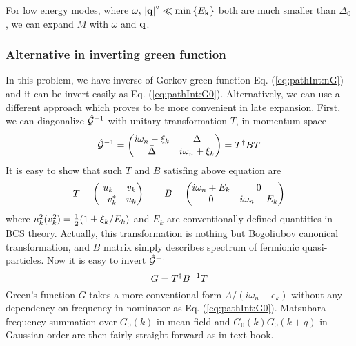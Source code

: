 For low energy modes, where $\omega,\,\lvert{\ensuremath{\mathbf{q}}}\rvert^{2}\ll\min\left\{E_{\mathbf{k}}\right\}$ both are much smaller than $\Delta_{0}$, we can expand $M$ with $\omega$ and $\mathbf{q}$.  


\subsubsection{Alternative in inverting green function\label{sec:diagonalizeGreen1}}
In this problem, we have inverse of Gorkov green function Eq. (\ref{eq:pathInt:nG}) and it can be invert easily as Eq. (\ref{eq:pathInt:G0}).   Alternatively, we can use a different approach which proves to be more convenient in late expansion.  First, we can diagonalize $\hat{\mathcal{G}}^{-1}$ with unitary transformation $T$, in momentum space
\begin{equation}
\hat{\mathcal{G}}^{-1}=\begin{pmatrix}i\omega_{n}-\xi_{k}&\Delta\\\bar\Delta&i\omega_{n}+\xi_{k}\end{pmatrix}=T^{\dagger}BT
\end{equation}
It is easy to show that such $T$ and $B$ satisfing above equation are
\begin{equation}
T=\begin{pmatrix}u_{k}&v_{k}\\-v_{k}^{*}&u_{k}\end{pmatrix}\qquad{}B=\begin{pmatrix}i\omega_{n}+E_{k}&0\\0&i\omega_{n}-E_{k}\end{pmatrix}
\end{equation}
where $u_{k}^{2}(v_{k}^{2})=\frac{1}{2}(1\pm\xi_{k}/E_{k})$ and $E_{k}$ are conventionally defined quantities in BCS theory.   Actually, this transformation is nothing but Bogoliubov canonical transformation, and $B$ matrix simply describes spectrum of fermionic quasi-particles.  Now it is easy to invert $\hat{\mathcal{G}}^{-1}$
\begin{equation}
G=T^{\dagger}B^{-1}T
\end{equation}
Green's function $G$ takes a more conventional form $A/(i\omega_{n}-e_{k})$ without any dependency on frequency in nominator as Eq. (\ref{eq:pathInt:G0}). Matsubara frequency summation over $G_{0}(k)$ in mean-field and $G_{0}(k)G_{0}(k+q)$ in Gaussian order are then fairly straight-forward as in text-book.  

